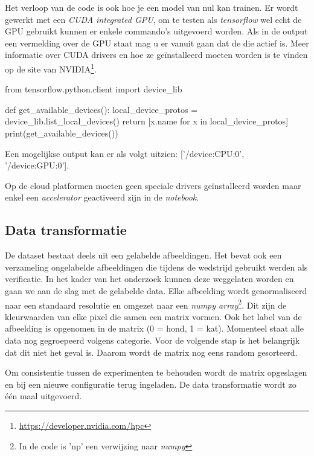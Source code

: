 Het verloop van de code is ook hoe je een model van nul kan trainen. Er wordt gewerkt met een \textit{CUDA integrated GPU}, om te testen als \textit{tensorflow} wel echt de GPU gebruikt kunnen er enkele commando's uitgevoerd worden. Als in de output een vermelding over de GPU staat mag u er vanuit gaan dat de die actief is. Meer informatie over CUDA drivers en hoe ze geïnstalleerd moeten worden is te vinden op de site van NVIDIA\footnote{\url{https://developer.nvidia.com/hpc}}.

\bigskip

\begin{python}
from tensorflow.python.client import device_lib

def get_available_devices():
    local_device_protos = device_lib.list_local_devices()
    return [x.name for x in local_device_protos]
print(get_available_devices()) 
\end{python}

Een mogelijkse output kan er als volgt uitzien: ['/device:CPU:0', '/device:GPU:0'].

Op de cloud platformen moeten geen speciale drivers geïnstalleerd worden maar enkel een \textit{accelerator} geactiveerd zijn in de \textit{notebook}.

\subsection{Data transformatie}
\label{subsec:autokeras-tranform}

De dataset bestaat deels uit een gelabelde afbeeldingen. Het bevat ook een verzameling ongelabelde afbeeldingen die tijdens de wedstrijd gebruikt werden als verificatie. In het kader van het onderzoek kunnen deze weggelaten worden en gaan we aan de slag met de gelabelde data. Elke afbeelding wordt genormaliseerd naar een standaard resolutie en omgezet naar een \textit{numpy array}\footnote{In de code is 'np' een verwijzing naar \textit{numpy}}. Dit zijn de kleurwaarden van elke pixel die samen een matrix vormen. Ook het label van de afbeelding is opgenomen in de matrix (0 = hond, 1 = kat). Momenteel staat alle data nog gegroepeerd volgens categorie. Voor de volgende stap is het belangrijk dat dit niet het geval is. Daarom wordt de matrix nog eens random gesorteerd.

Om consistentie tussen de experimenten te behouden wordt de matrix opgeslagen en bij een nieuwe configuratie terug ingeladen. De data transformatie wordt zo één maal uitgevoerd.

